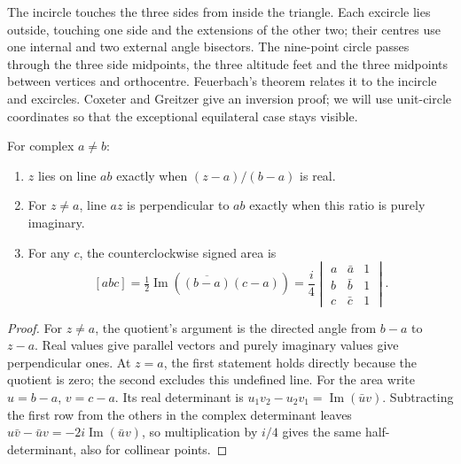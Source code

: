 The incircle touches the three sides from inside the triangle. Each excircle lies outside, touching one side and the extensions of the other two; their centres use one internal and two external angle bisectors. The nine-point circle passes through the three side midpoints, the three altitude feet and the three midpoints between vertices and orthocentre. Feuerbach's theorem relates it to the incircle and excircles. Coxeter and Greitzer give an inversion proof; we will use unit-circle coordinates so that the exceptional equilateral case stays visible.

\begin{proposition}\label{geometry:prop:tests}
For complex $a\ne b$:
\begin{enumerate}
\item $z$ lies on line $ab$ exactly when $(z-a)/(b-a)$ is real.
\item For $z\ne a$, line $az$ is perpendicular to $ab$ exactly when this ratio is purely imaginary.
\item For any $c$, the counterclockwise signed area is
\[
[abc]=\tfrac12\operatorname{Im}(\overline{(b-a)}(c-a))
=\frac i4\begin{vmatrix}a&\bar a&1\\b&\bar b&1\\c&\bar c&1\end{vmatrix}.
\]
\end{enumerate}
\end{proposition}
\begin{proof}
For $z\ne a$, the quotient's argument is the directed angle from $b-a$ to $z-a$. Real values give parallel vectors and purely imaginary values give perpendicular ones. At $z=a$, the first statement holds directly because the quotient is zero; the second excludes this undefined line. For the area write $u=b-a$, $v=c-a$. Its real determinant is $u_1v_2-u_2v_1=\operatorname{Im}(\bar uv)$. Subtracting the first row from the others in the complex determinant leaves $u\bar v-\bar uv=-2i\operatorname{Im}(\bar uv)$, so multiplication by $i/4$ gives the same half-determinant, also for collinear points.
\end{proof}

